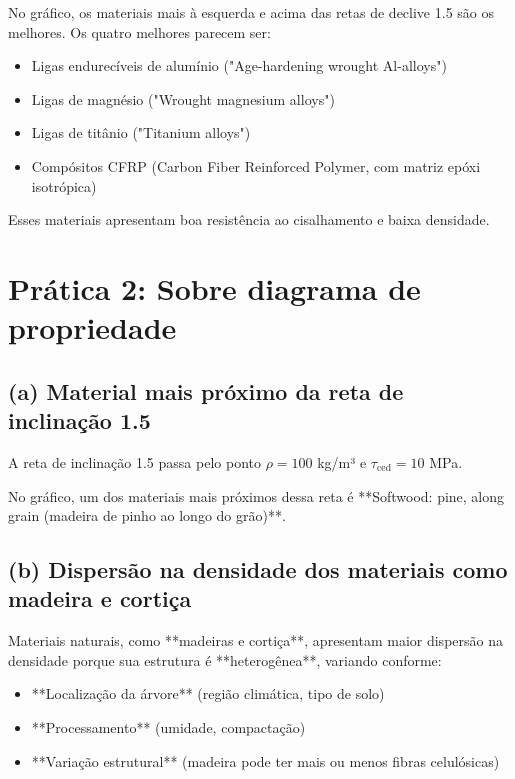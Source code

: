 No gráfico, os materiais mais à esquerda e acima das retas de declive 1.5 são os melhores. Os quatro melhores parecem ser:

\begin{itemize}
    \item Ligas endurecíveis de alumínio ("Age-hardening wrought Al-alloys")
    \item Ligas de magnésio ("Wrought magnesium alloys")
    \item Ligas de titânio ("Titanium alloys")
    \item Compósitos CFRP (Carbon Fiber Reinforced Polymer, com matriz epóxi isotrópica)
\end{itemize}

Esses materiais apresentam boa resistência ao cisalhamento e baixa densidade.

\section{Prática 2: Sobre diagrama de propriedade}

\subsection{(a) Material mais próximo da reta de inclinação 1.5}

A reta de inclinação 1.5 passa pelo ponto \( \rho = 100 \) kg/m³ e \( \tau_{\text{ced}} = 10 \) MPa.

No gráfico, um dos materiais mais próximos dessa reta é **Softwood: pine, along grain (madeira de pinho ao longo do grão)**.

\subsection{(b) Dispersão na densidade dos materiais como madeira e cortiça}

Materiais naturais, como **madeiras e cortiça**, apresentam maior dispersão na densidade porque sua estrutura é **heterogênea**, variando conforme:

\begin{itemize}
    \item **Localização da árvore** (região climática, tipo de solo)
    \item **Processamento** (umidade, compactação)
    \item **Variação estrutural** (madeira pode ter mais ou menos fibras celulósicas)
\end{itemize}

